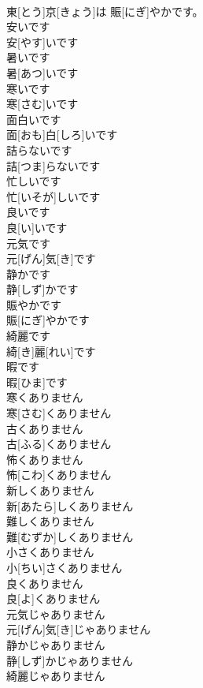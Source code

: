 \documentclass[8pt]{extreport}
\begin{document}
\begin{CJK}{UTF8}{min}
\\	東[とう]京[きょう]は 賑[にぎ]やかです。
\\	安いです	
\\	安[やす]いです
\\	暑いです	
\\	暑[あつ]いです
\\	寒いです	
\\	寒[さむ]いです
\\	面白いです	
\\	面[おも]白[しろ]いです
\\	詰らないです	
\\	詰[つま]らないです
\\	忙しいです	
\\	忙[いそが]しいです
\\	良いです	
\\	良[い]いです
\\	元気です	
\\	元[げん]気[き]です
\\	静かです	
\\	静[しず]かです
\\	賑やかです	
\\	賑[にぎ]やかです
\\	綺麗です	
\\	綺[き]麗[れい]です
\\	暇です	
\\	暇[ひま]です
\\	寒くありません	
\\	寒[さむ]くありません
\\	古くありません	
\\	古[ふる]くありません
\\	怖くありません	
\\	怖[こわ]くありません
\\	新しくありません	
\\	新[あたら]しくありません
\\	難しくありません	
\\	難[むずか]しくありません
\\	小さくありません	
\\	小[ちい]さくありません
\\	良くありません	
\\	良[よ]くありません
\\	元気じゃありません	
\\	元[げん]気[き]じゃありません
\\	静かじゃありません	
\\	静[しず]かじゃありません
\\	綺麗じゃありません	

\end{CJK}
\end{document}
